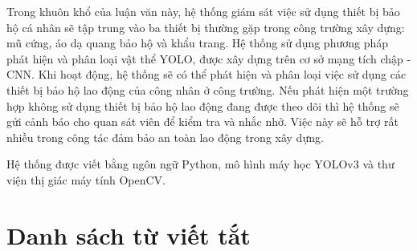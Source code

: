 \documentclass[12pt]{report}
\begin{document}
Trong khuôn khổ của luận văn này, hệ thống giám sát việc sử dụng thiết bị bảo hộ cá nhân 
sẽ tập trung vào ba thiết bị thường gặp trong công trường xây dựng: mũ cứng, áo dạ quang 
bảo hộ và khẩu trang. Hệ thống sử dụng phương pháp phát hiện và phân loại vật thể YOLO, 
được xây dựng trên cơ sở mạng tích chập - CNN. Khi hoạt động, hệ thống sẽ có thể phát hiện 
và phân loại việc sử dụng các thiết bị bảo hộ lao động của công nhân ở công trường. Nếu phát 
hiện một trường hợp không sử dụng thiết bị bảo hộ lao động đang được theo dõi thì hệ thống 
sẽ gửi cảnh báo cho quan sát viên để kiểm tra và nhắc nhở. Việc này sẽ hỗ trợ rất nhiều trong 
công tác đảm bảo an toàn lao động trong xây dựng.

Hệ thống được viết bằng ngôn ngữ Python, mô hình máy học YOLOv3 và thư viện thị giác máy tính 
OpenCV.

%
\tableofcontents

%
\listoffigures

\listoftables

\chapter*{Danh sách từ viết tắt}
\begin{acronym}
\end{acronym}

%
\newpage\cleardoublepage
\newpage\cleardoublepage
\newpage\cleardoublepage
\newpage\cleardoublepage
\newpage\cleardoublepage

\nocite{*}
\newpage\cleardoublepage

\end{document}
